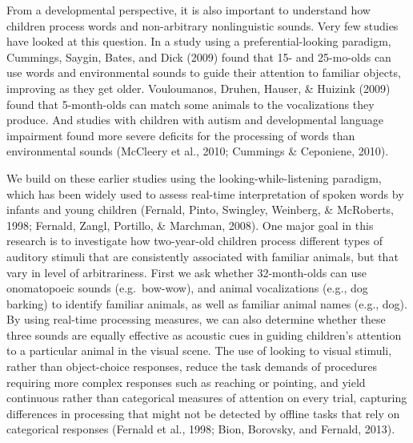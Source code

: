\documentclass[english,floatsintext,man]{apa6}
\theoremstyle{definition}
\theoremstyle{definition}
\theoremstyle{definition}
\theoremstyle{remark}
\begin{document}
From a developmental perspective, it is also important to understand how
children process words and non-arbitrary nonlinguistic sounds. Very few
studies have looked at this question. In a study using a
preferential-looking paradigm, Cummings, Saygin, Bates, and Dick (2009)
found that 15- and 25-mo-olds can use words and environmental sounds to
guide their attention to familiar objects, improving as they get older.
Vouloumanos, Druhen, Hauser, \& Huizink (2009) found that 5-month-olds
can match some animals to the vocalizations they produce. And studies
with children with autism and developmental language impairment found
more severe deficits for the processing of words than environmental
sounds (McCleery et al., 2010; Cummings \& Ceponiene, 2010).

We build on these earlier studies using the looking-while-listening
paradigm, which has been widely used to assess real-time interpretation
of spoken words by infants and young children (Fernald, Pinto, Swingley,
Weinberg, \& McRoberts, 1998; Fernald, Zangl, Portillo, \& Marchman,
2008). One major goal in this research is to investigate how
two-year-old children process different types of auditory stimuli that
are consistently associated with familiar animals, but that vary in
level of arbitrariness. First we ask whether 32-month-olds can use
onomatopoeic sounds (e.g.~bow-wow), and animal vocalizations (e.g., dog
barking) to identify familiar animals, as well as familiar animal names
(e.g., dog). By using real-time processing measures, we can also
determine whether these three sounds are equally effective as acoustic
cues in guiding children's attention to a particular animal in the
visual scene. The use of looking to visual stimuli, rather than
object-choice responses, reduce the task demands of procedures requiring
more complex responses such as reaching or pointing, and yield
continuous rather than categorical measures of attention on every trial,
capturing differences in processing that might not be detected by
offline tasks that rely on categorical responses (Fernald et al., 1998;
Bion, Borovsky, and Fernald, 2013).
\end{document}
